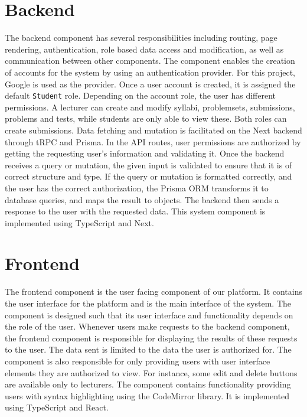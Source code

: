 \section{Backend}
The backend component has several responsibilities including routing, page rendering, authentication, role based data access and modification, as well as communication between other components. 
The component enables the creation of accounts for the system by using an authentication provider.
For this project, Google is used as the provider. 
Once a user account is created, it is assigned the default \texttt{Student} role.  
Depending on the account role, the user has different permissions.
A lecturer can create and modify syllabi, problemsets, submissions, problems and tests, while students are only able to view these. Both roles can create submissions.
Data fetching and mutation is facilitated on the Next backend through tRPC and Prisma. In the API routes, user permissions are authorized by getting the requesting user's information and validating it.
Once the backend receives a query or mutation, the given input is validated to ensure that it is of correct structure and type.
If the query or mutation is formatted correctly, and the user has the correct authorization, the Prisma ORM transforms it to database queries, and maps the result to \javascript{} objects.
The backend then sends a response to the user with the requested data.
This system component is implemented using TypeScript and Next.

\section{Frontend} \label{sec:architecture-frontend}
The frontend component is the user facing component of our platform.  It contains the user interface for the platform and is the main interface of the system.
The component is designed such that its user interface and functionality depends on the role of the user.
Whenever users make requests to the backend component, the frontend component is responsible for displaying the results of these requests to the user. The data sent is limited to the data the user is authorized for.
The component is also responsible for only providing users with user interface elements they are authorized to view. 
For instance, some edit and delete buttons are available only to lecturers.
The component contains functionality providing users with syntax highlighting using the CodeMirror library. 
It is implemented using TypeScript and React. 

